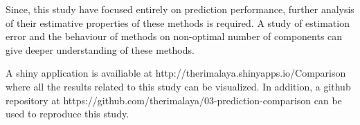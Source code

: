 \documentclass[12pt,3p,authoryear]{elsarticle}
\begin{document}
Since, this study have focused entirely on prediction performance,
further analysis of their estimative properties of these methods is
required. A study of estimation error and the behaviour of methods on
non-optimal number of components can give deeper understanding of these
methods.

A shiny application \citep{shiny} is availiable at
http://therimalaya.shinyapps.io/Comparison where all the results related
to this study can be visualized. In addition, a github repository at
https://github.com/therimalaya/03-prediction-comparison can be used to
reproduce this study.

\hypertarget{refs}{}

\hypertarget{appendix-appendix-a}{%
\appendix}



\renewcommand\refname{References}

\end{document}
